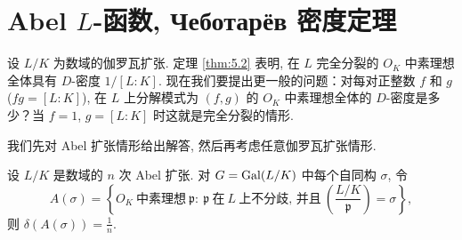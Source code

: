 \setcounter{example}{0}%

\section{\texorpdfstring{Abel $L$-函数, Чеботарёв 密度定理}{Abel L-函数, Chebotarev 密度定理}}\label{sec:ch5-s2}

设 $L/K$ 为数域的伽罗瓦扩张. 定理 \ref{thm:5.2} 表明, 在 $L$ 完全分裂的 $O_K$ 中素理想全体具有 $D$-密度 $1/[L:K]$. 现在我们要提出更一般的问题：对每对正整数 $f$ 和 $g$($fg=[L:K]$), 在 $L$ 上分解模式为 $(f,g)$ 的 $O_K$ 中素理想全体的 $D$-密度是多少？当 $f=1$, $g=[L:K]$ 时这就是完全分裂的情形. 

我们先对 Abel 扩张情形给出解答, 然后再考虑任意伽罗瓦扩张情形. 

\begin{theorem}\label{thm:5.3}
设 $L/K$ 是数域的 $n$ 次 Abel 扩张. 对 $G=\operatorname{Gal}(L/K)$ 中每个自同构 $\sigma$, 令
\[
  A(\sigma)=\left\{O_K\ \text{中素理想}\ \mathfrak{p}:\ \mathfrak{p}\ \text{在}\ L\ \text{上不分歧, 并且}\ \left(\frac{L/K}{\mathfrak{p}}\right)=\sigma\right\},
\]
则 $\delta(A(\sigma))=\frac{1}{n}$. 
\end{theorem}

